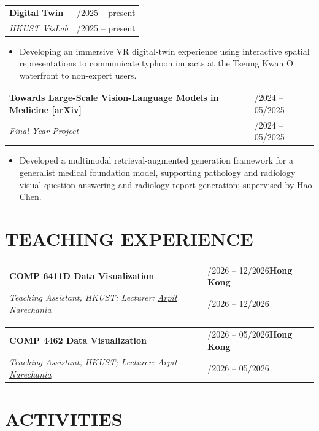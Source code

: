 \documentclass[9pt,a4paper]{extarticle}
\makeatletter
\newcommand{\cventry}[5]{%
  \begin{tabularx}{\textwidth}{@{}X>{\raggedleft\arraybackslash}p{5.0cm}@{}}
    \textbf{#1} & \if\relax\detokenize{#2}\relax #4\else\textbf{#2}\fi \\
    \textit{#3} & \if\relax\detokenize{#2}\relax\else #4\fi
  \end{tabularx}
  #5\par\vspace{0.8pt}
}
\makeatother
\begin{document}
\cventry{Digital Twin}{}{HKUST VisLab}{09/2025 -- present}{
  \begin{itemize}\item Developing an immersive VR digital-twin experience using interactive spatial representations to communicate typhoon impacts at the Tseung Kwan O waterfront to non-expert users.\end{itemize}}

\cventry{Towards Large-Scale Vision-Language Models in Medicine \normalfont\href{https://arxiv.org/pdf/2506.00855}{[arXiv]}}{}{Final Year Project}{06/2024 -- 05/2025}{
  \begin{itemize}\item Developed a multimodal retrieval-augmented generation framework for a generalist medical foundation model, supporting pathology and radiology visual question answering and radiology report generation; supervised by Hao Chen.\end{itemize}}

% 
% 

\section{TEACHING EXPERIENCE}

\cventry{COMP 6411D Data Visualization}{Hong Kong}{Teaching Assistant, HKUST; Lecturer: \href{https://narechania.com}{Arpit Narechania}}{09/2026 -- 12/2026}{}
\cventry{COMP 4462 Data Visualization}{Hong Kong}{Teaching Assistant, HKUST; Lecturer: \href{https://narechania.com}{Arpit Narechania}}{02/2026 -- 05/2026}{}

\section{ACTIVITIES}
\end{document}
